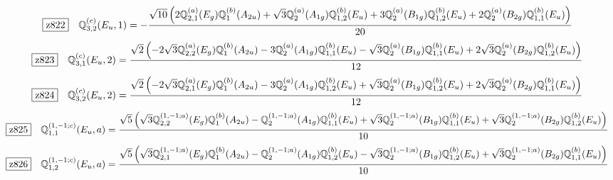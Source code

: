 \documentclass[fleqn,10pt,landscape]{jsarticle}
\begin{document}
\begin{dmath*}
\hspace*{3mm}\fbox{z822}\quad \mathbb{Q}_{3,2}^{(c)}(E_{u},1)=- \frac{\sqrt{10} \left(2 \mathbb{Q}_{2,1}^{(a)}(E_{g}) \mathbb{Q}_{1}^{(b)}(A_{2u}) + \sqrt{3} \mathbb{Q}_{2}^{(a)}(A_{1g}) \mathbb{Q}_{1,2}^{(b)}(E_{u}) + 3 \mathbb{Q}_{2}^{(a)}(B_{1g}) \mathbb{Q}_{1,2}^{(b)}(E_{u}) + 2 \mathbb{Q}_{2}^{(a)}(B_{2g}) \mathbb{Q}_{1,1}^{(b)}(E_{u})\right)}{20}
\end{dmath*}
\begin{dmath*}
\hspace*{3mm}\fbox{z823}\quad \mathbb{Q}_{3,1}^{(c)}(E_{u},2)=\frac{\sqrt{2} \left(- 2 \sqrt{3} \mathbb{Q}_{2,2}^{(a)}(E_{g}) \mathbb{Q}_{1}^{(b)}(A_{2u}) - 3 \mathbb{Q}_{2}^{(a)}(A_{1g}) \mathbb{Q}_{1,1}^{(b)}(E_{u}) - \sqrt{3} \mathbb{Q}_{2}^{(a)}(B_{1g}) \mathbb{Q}_{1,1}^{(b)}(E_{u}) + 2 \sqrt{3} \mathbb{Q}_{2}^{(a)}(B_{2g}) \mathbb{Q}_{1,2}^{(b)}(E_{u})\right)}{12}
\end{dmath*}
\begin{dmath*}
\hspace*{3mm}\fbox{z824}\quad \mathbb{Q}_{3,2}^{(c)}(E_{u},2)=\frac{\sqrt{2} \left(- 2 \sqrt{3} \mathbb{Q}_{2,1}^{(a)}(E_{g}) \mathbb{Q}_{1}^{(b)}(A_{2u}) - 3 \mathbb{Q}_{2}^{(a)}(A_{1g}) \mathbb{Q}_{1,2}^{(b)}(E_{u}) + \sqrt{3} \mathbb{Q}_{2}^{(a)}(B_{1g}) \mathbb{Q}_{1,2}^{(b)}(E_{u}) + 2 \sqrt{3} \mathbb{Q}_{2}^{(a)}(B_{2g}) \mathbb{Q}_{1,1}^{(b)}(E_{u})\right)}{12}
\end{dmath*}
\begin{dmath*}
\hspace*{3mm}\fbox{z825}\quad \mathbb{Q}_{1,1}^{(1,-1;c)}(E_{u},a)=\frac{\sqrt{5} \left(\sqrt{3} \mathbb{Q}_{2,2}^{(1,-1;a)}(E_{g}) \mathbb{Q}_{1}^{(b)}(A_{2u}) - \mathbb{Q}_{2}^{(1,-1;a)}(A_{1g}) \mathbb{Q}_{1,1}^{(b)}(E_{u}) + \sqrt{3} \mathbb{Q}_{2}^{(1,-1;a)}(B_{1g}) \mathbb{Q}_{1,1}^{(b)}(E_{u}) + \sqrt{3} \mathbb{Q}_{2}^{(1,-1;a)}(B_{2g}) \mathbb{Q}_{1,2}^{(b)}(E_{u})\right)}{10}
\end{dmath*}
\begin{dmath*}
\hspace*{3mm}\fbox{z826}\quad \mathbb{Q}_{1,2}^{(1,-1;c)}(E_{u},a)=\frac{\sqrt{5} \left(\sqrt{3} \mathbb{Q}_{2,1}^{(1,-1;a)}(E_{g}) \mathbb{Q}_{1}^{(b)}(A_{2u}) - \mathbb{Q}_{2}^{(1,-1;a)}(A_{1g}) \mathbb{Q}_{1,2}^{(b)}(E_{u}) - \sqrt{3} \mathbb{Q}_{2}^{(1,-1;a)}(B_{1g}) \mathbb{Q}_{1,2}^{(b)}(E_{u}) + \sqrt{3} \mathbb{Q}_{2}^{(1,-1;a)}(B_{2g}) \mathbb{Q}_{1,1}^{(b)}(E_{u})\right)}{10}
\end{dmath*}
\end{document}
